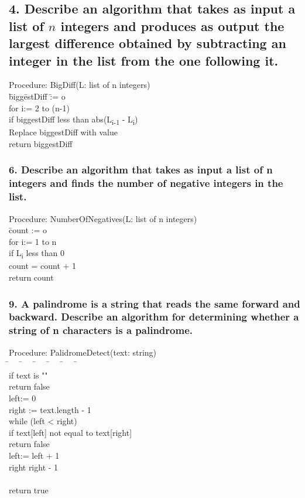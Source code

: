 \documentclass[11pt, oneside]{article} %
\numberwithin{equation}{section} %
\numberwithin{figure}{section} %
\numberwithin{table}{section} %
\begin{document}
\subsection{4. Describe an algorithm that takes as input a list of $n$ integers and produces as output the largest difference obtained by subtracting an integer in the list from the one following it.}
\begin{tabbing}
Procedure: BigDiff(L: list of n integers) \\
\=  bigg\=estDiff \=:= o \= \= \= \= \\
for i:= 2 to (n-1) \\
\> \> if biggestDiff less than abs(L\textsubscript{i-1} - L\textsubscript{i}) \\
\> \> \> Replace biggestDiff with value \\
\> return biggestDiff
\end{tabbing}

\subsubsection{6. Describe an algorithm that takes as input a list of n integers and finds the number of negative integers in the list.}
\begin{tabbing}
Procedure: NumberOfNegatives(L: list of n integers) \\
\=  count := o \= \= \= \= \= \\
\> for i:= 1 to n\\
\> \> if L\textsubscript{i} less than 0 \\
\> \> \> \> count = count + 1 \\
\> return count
\end{tabbing}

\subsubsection{9. A palindrome is a string that reads the same forward and backward. Describe an algorithm for determining whether a string of n characters is a palindrome.}
\begin{tabbing}
Procedure: PalidromeDetect(text: string) \\
\= $\quad$ \= $\quad$ \= $\quad$ \= $\quad$ \= $\quad$ \= $\quad$\\
if text is "" \\
\> \> return false \\
left:= 0 \\
right := text.length - 1 \\
while (left < right) \\
\> \> if text[left] not equal to text[right] \\
\> \> \> \>return false \\
\> \>left:= left + 1 \\
\> \>right right - 1 \\\\
return true
\end{tabbing}
\end{document}

